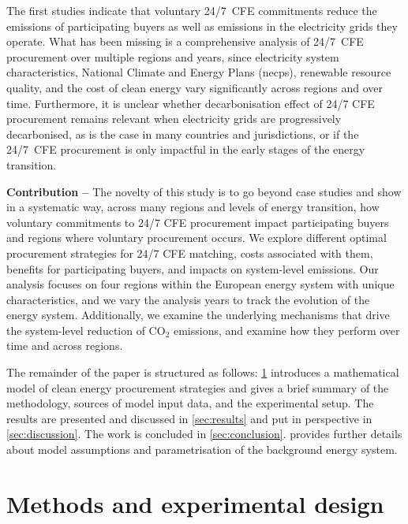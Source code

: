 \documentclass[11pt, 5p, nopreprintline]{elsarticle}
\begin{document}
The first studies indicate that voluntary 24/7~CFE commitments reduce the emissions of participating buyers as well as emissions in the electricity grids they operate.
What has been missing is a comprehensive analysis of 24/7~CFE procurement over multiple regions and years, since electricity system characteristics, National Climate and Energy Plans (\gls{necp}s), renewable resource quality, and the cost of clean energy vary significantly across regions and over time.
Furthermore, it is unclear whether decarbonisation effect of 24/7 CFE procurement remains relevant when electricity grids are progressively decarbonised, as is the case in many countries and jurisdictions, or if the 24/7~CFE procurement is only impactful in the early stages of the energy transition.


\textbf{Contribution --} The novelty of this study is to go beyond case studies and show in a systematic way, across many regions and levels of energy transition, how voluntary commitments to 24/7 CFE procurement impact participating buyers and regions where voluntary procurement occurs.
We explore different optimal procurement strategies for 24/7 CFE matching, costs associated with them, benefits for participating buyers, and impacts on system-level emissions.
Our analysis focuses on four regions within the European energy system with unique characteristics, and we vary the analysis years to track the evolution of the energy system.
Additionally, we examine the underlying mechanisms that drive the system-level reduction of CO$_2$ emissions, and examine how they perform over time and across regions.


The remainder of the paper is structured as follows: \cref{sec:methods} introduces a mathematical model of clean energy procurement strategies and gives a brief summary of the methodology, sources of model input data, and the experimental setup.
The results are presented and discussed in \cref{sec:results} and put in perspective in \cref{sec:discussion}.
The work is concluded in \cref{sec:conclusion}.
 provides further details about model assumptions and parametrisation of the background energy system.

\section{Methods and experimental design}
\label{sec:methods}
\end{document}
